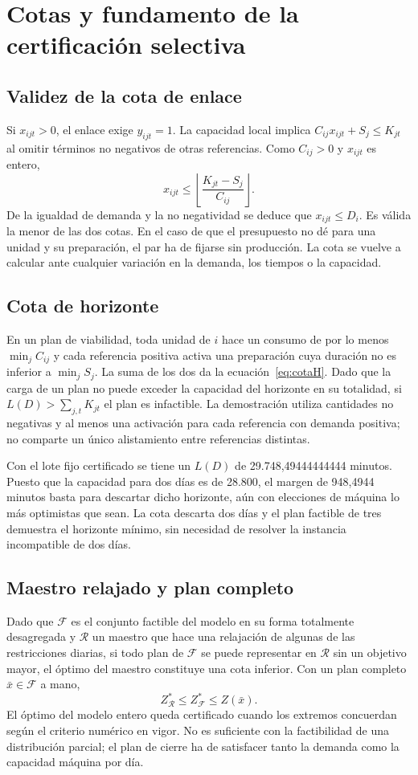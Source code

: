\documentclass[12pt,a4paper,oneside]{article}
\begin{document}
\section{Cotas y fundamento de la certificación selectiva}\label{an:prueba}
\subsection{Validez de la cota de enlace}
Si $x_{ijt}>0$, el enlace exige $y_{ijt}=1$. La capacidad local implica $C_{ij}x_{ijt}+S_j\leq K_{jt}$ al omitir términos no negativos de otras referencias. Como $C_{ij}>0$ y $x_{ijt}$ es entero,
\[
x_{ijt}\leq\left\lfloor\frac{K_{jt}-S_j}{C_{ij}}\right\rfloor.
\]
De la igualdad de demanda y la no negatividad se deduce que $x_{ijt}\leq D_i$. Es válida la menor de las dos cotas. En el caso de que el presupuesto no dé para una unidad y su preparación, el par ha de fijarse sin producción. La cota se vuelve a calcular ante cualquier variación en la demanda, los tiempos o la capacidad.

\subsection{Cota de horizonte}
En un plan de viabilidad, toda unidad de $i$ hace un consumo de por lo menos $\min_j C_{ij}$ y cada referencia positiva activa una preparación cuya duración no es inferior a $\min_jS_j$. La suma de los dos da la ecuación~\eqref{eq:cotaH}. Dado que la carga de un plan no puede exceder la capacidad del horizonte en su totalidad, si $L(D)>\sum_{j,t}K_{jt}$ el plan es infactible. La demostración utiliza cantidades no negativas y al menos una activación para cada referencia con demanda positiva; no comparte un único alistamiento entre referencias distintas.

Con el lote fijo certificado se tiene un $L(D)$ de 29.748,49444444444 minutos. Puesto que la capacidad para dos días es de 28.800, el margen de 948,4944 minutos basta para descartar dicho horizonte, aún con elecciones de máquina lo más optimistas que sean. La cota descarta dos días y el plan factible de tres demuestra el horizonte mínimo, sin necesidad de resolver la instancia incompatible de dos días.

\subsection{Maestro relajado y plan completo}
Dado que $\mathcal F$ es el conjunto factible del modelo en su forma totalmente desagregada y $\mathcal R$ un maestro que hace una relajación de algunas de las restricciones diarias, si todo plan de $\mathcal F$ se puede representar en $\mathcal R$ sin un objetivo mayor, el óptimo del maestro constituye una cota inferior. Con un plan completo $\bar x\in\mathcal F$ a mano,
\[
Z_{\mathcal R}^*\leq Z_{\mathcal F}^*\leq Z(\bar x).
\]
El óptimo del modelo entero queda certificado cuando los extremos concuerdan según el criterio numérico en vigor. No es suficiente con la factibilidad de una distribución parcial; el plan de cierre ha de satisfacer tanto la demanda como la capacidad máquina por día.
\end{document}
